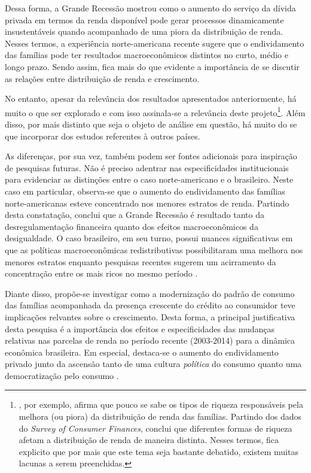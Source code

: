  
Dessa forma, a Grande Recessão mostrou como o aumento do serviço da dívida privada em termos da renda disponível pode gerar processos dinamicamente insustentáveis quando acompanhado de uma piora da distribuição de renda.
Nesses termos, a experiência norte-americana recente sugere que o endividamento das famílias pode ter resultados macroeconômicos distintos no curto, médio e longo prazo. 
Sendo assim, fica mais do que evidente a importância de se discutir as relações entre distribuição de renda e crescimento.

No entanto, apesar da relevância dos resultados apresentados anteriormente, há muito o que ser explorado e com isso assinala-se a relevância deste projeto\footnote{\textcite{szymborska_household_2018}, por exemplo, afirma que pouco se sabe os tipos de riqueza responsáveis pela melhora (ou piora) da distribuição de renda das famílias. Partindo dos dados do \textit{Survey of Consumer Finances}, conclui que diferentes formas de riqueza afetam a distribuição de renda de maneira distinta. Nesses termos, fica explicito que por mais que este tema seja bastante debatido, existem muitas lacunas a serem preenchidas.}. 
Além disso, por mais distinto que seja o objeto de análise em questão, há muito do se que incorporar dos estudos referentes à outros países.  

As diferenças, por sua vez, também podem ser fontes adicionais para inspiração de pesquisas futuras. Não é preciso adentrar nas especificidades institucionais para evidenciar as distinções entre o caso norte-americano e o brasileiro. Neste caso em particular, observa-se que o aumento do endividamento das famílias norte-americanas esteve concentrado nos menores estratos de renda. Partindo desta constatação, \textcite{stockhammer_rising_2015} conclui que a Grande Recessão é resultado tanto da desregulamentação financeira quanto dos efeitos macroeconômicos da desigualdade. O caso brasileiro, em seu turno, possui nuances significativas em que as políticas macroeconômicas redistributivas possibilitaram uma melhora nos menores estratos enquanto pesquisas recentes sugerem um acirramento da concentração entre os mais ricos no mesmo período \cite{medeiros_upper_2015}.


Diante disso, propõe-se investigar como a modernização do padrão de consumo das famílias acompanhada da presença crescente do crédito ao consumidor teve implicações relvantes sobre o crescimento. 
Desta forma, a principal justificativa desta pesquisa é a importância dos efeitos e especificidades das mudanças relativas nas parcelas de renda no período recente (2003-2014) para a dinâmica econômica brasileira. Em especial, destaca-se o aumento do endividamento privado \cite{ribeiro_o_2016} junto  da ascensão tanto de uma cultura \textit{política} do consumo quanto uma democratização pelo consumo  \cite{fontenelle_alcances_2016}. 

